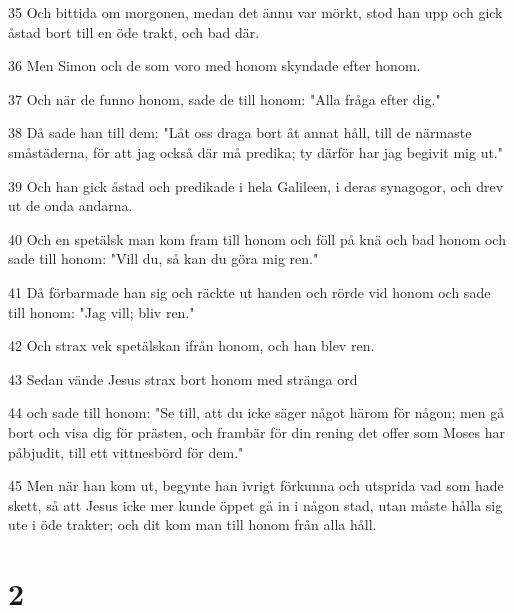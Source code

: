 \par 35 Och bittida om morgonen, medan det ännu var mörkt, stod han upp och gick åstad bort till en öde trakt, och bad där.
\par 36 Men Simon och de som voro med honom skyndade efter honom.
\par 37 Och när de funno honom, sade de till honom: "Alla fråga efter dig."
\par 38 Då sade han till dem: "Låt oss draga bort åt annat håll, till de närmaste småstäderna, för att jag också där må predika; ty därför har jag begivit mig ut."
\par 39 Och han gick åstad och predikade i hela Galileen, i deras synagogor, och drev ut de onda andarna.
\par 40 Och en spetälsk man kom fram till honom och föll på knä och bad honom och sade till honom: "Vill du, så kan du göra mig ren."
\par 41 Då förbarmade han sig och räckte ut handen och rörde vid honom och sade till honom: "Jag vill; bliv ren."
\par 42 Och strax vek spetälskan ifrån honom, och han blev ren.
\par 43 Sedan vände Jesus strax bort honom med stränga ord
\par 44 och sade till honom: "Se till, att du icke säger något härom för någon; men gå bort och visa dig för prästen, och frambär för din rening det offer som Moses har påbjudit, till ett vittnesbörd för dem."
\par 45 Men när han kom ut, begynte han ivrigt förkunna och utsprida vad som hade skett, så att Jesus icke mer kunde öppet gå in i någon stad, utan måste hålla sig ute i öde trakter; och dit kom man till honom från alla håll.

\chapter{2}

